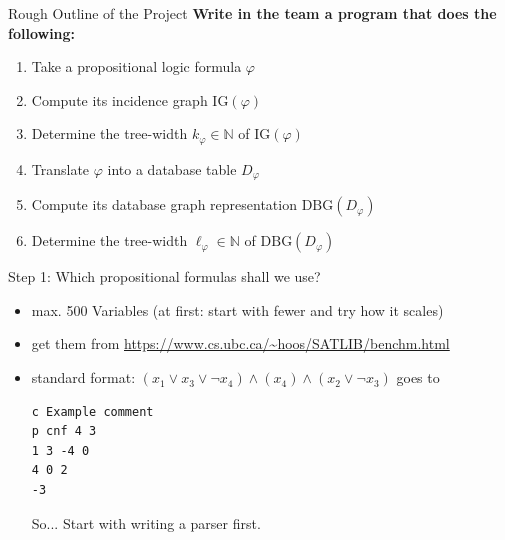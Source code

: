 \documentclass[aspectratio=169]{beamer}
\newcommand{\IG}{\mathrm{IG}}
\newcommand{\DBG}{\mathrm{DBG}}
\begin{document}
\begin{frame}{Rough Outline of the Project}
\textbf{Write in the team a program that does the following:}
\begin{enumerate}
	\item<+-> Take a propositional logic formula $\varphi$
	\item<+-> Compute its incidence graph $\IG(\varphi)$
	\item<+-> Determine the tree-width $k_\varphi\in\mathbb N$ of $\IG(\varphi)$
	\item<+-> Translate $\varphi$ into a database table $D_\varphi$
	\item<+-> Compute its database graph representation $\DBG(D_\varphi)$
	\item<+-> Determine the tree-width $\ell_\varphi\in\mathbb N$ of $\DBG(D_\varphi)$
\end{enumerate}\bigskip

\end{frame}


\begin{frame}[fragile]{Step 1: Which propositional formulas shall we use?}
\begin{itemize}
	\item max. 500 Variables (at first: start with fewer and try how it scales)
	\item get them from \url{https://www.cs.ubc.ca/~hoos/SATLIB/benchm.html}
	\item standard format: $(x_1\lor x_3\lor \lnot x_4)\land (x_4)\land (x_2\lor \lnot x_3)$ goes to
\begin{center}
	\begin{verbatim}
c Example comment
p cnf 4 3
1 3 -4 0
4 0 2
-3	
	\end{verbatim}
\end{center}
\alert{So...} Start with writing a parser first.
\end{itemize}
\end{frame}
\end{document}
